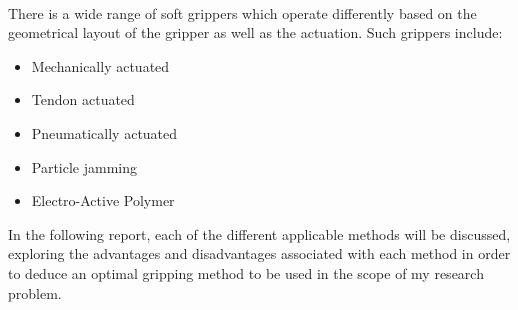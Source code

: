 \documentclass[11pt,twocolumn]{article}
\begin{document}
\\
\newline
There is a wide range of soft grippers which operate differently based on the geometrical layout of the gripper as well as the actuation. Such grippers include:
\begin{itemize}
\item Mechanically actuated
\item Tendon actuated
\item Pneumatically actuated
\item Particle jamming
\item Electro-Active Polymer  
\end{itemize}
In the following report, each of the different applicable methods will be discussed, exploring the advantages and disadvantages associated with each method in order to deduce an optimal gripping method to be used in the scope of my research problem.
\end{document}
